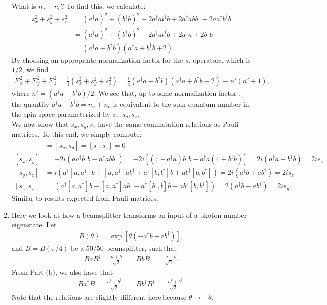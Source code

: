 \documentclass{article}
\theoremstyle{definition}
\newcommand{\f}[2]{\frac{#1}{#2}}
\newcommand{\lp}{\left(}
\newcommand{\rp}{\right)}
\newcommand{\lb}{\left[}
\newcommand{\rb}{\right]}
\begin{document}
\begin{enumerate}[label=\alph*)]
\noindent What is $n_a + n_b$? To find this, we calculate:
\begin{align*}
s_x^2 + s_y^2 + s_z^2 
&= (a^\dagger a)^2 + (b^\dagger b)^2 - 2a^\dagger a b^\dagger b + 2a^\dagger a bb^\dagger + 2 aa^\dagger b^\dagger b  \\
&=  (a^\dagger a)^2 + (b^\dagger b)^2 + 2a^\dagger a b^\dagger b + 2a^\dagger a + 2b^\dagger b \\
&= (a^\dagger a + b^\dagger b) ( a^\dagger a + b^\dagger b + 2).
\end{align*}
By choosing an appropriate normalization factor for the $s_i$ operators, which is $1/2$, we find 
\begin{align*}
\Sigma_x^2 + \Sigma_y^2 + \Sigma_z^2 = \f{1}{4}(s_x^2 + s_y^2 + s_z^2) = \f{1}{4} (a^\dagger a + b^\dagger b) ( a^\dagger a + b^\dagger b + 2) \equiv n' (n'+1),
\end{align*}
where $n' = (a^\dagger a + b^\dagger b)/2$. We see that, up to some normalization factor , the quantity $a^\dagger a + b^\dagger b = n_a + n_b$ is equivalent to the spin quantum number in the spin space parameterized by $s_x, s_y, s_z$. \\


\noindent We now show that $s_x, s_y, s_z$ have the same commutation relations as Pauli matrices. To this end, we simply compute:
\begin{align*}
[s_x, s_x] &= [s_y, s_y] = [s_z, s_z] = 0\\
[s_x, s_y] &= -2i (aa^\dagger b^\dagger b - a^\dagger a bb^\dagger) = -2i [ (1 + a^\dagger a)b^\dagger b - a^\dagger a(1+b^\dagger b)  ] = 2 i( a^\dagger a - b^\dagger b ) = 2 i s_z  \\
[s_y, s_z] &= i ( a^\dagger [a,a^\dagger] b + [a,a^\dagger]ab^\dagger + a^\dagger [b,b^\dagger] b + ab^\dagger [b,b^\dagger]) =  2 i ( a^\dagger b + ab^\dagger) = 2 i s_x \\
[s_z, s_x] &=  (a^\dagger [a,a^\dagger] b - [a,a^\dagger] ab^\dagger - a^\dagger [b^\dagger,b] b - ab^\dagger[b,b^\dagger]) = 2 (a^\dagger b - ab^\dagger ) =  2 i s_y.
\end{align*}
Similar to results expected from Pauli matrices. 

\item Here we look at how a beamsplitter transforms an input of a photon-number eigenstate. Let 
\begin{align*}
B(\theta) = \exp\lb \theta \lp -a^\dagger b + ab^\dagger  \rp\rb,
\end{align*}
and $B = B(\pi/4)$ be a 50/50 beamsplitter, such that
\begin{align*}
BaB^\dagger = \f{a+b}{\sqrt{2}} \quad\quad  BbB^\dagger = \f{-a + b}{\sqrt{2}}.
\end{align*}
From Part (b), we also have that
\begin{align*}
Ba^\dagger B^\dagger = \f{a^\dagger + b^\dagger}{\sqrt{2}} \quad\quad Bb^\dagger B^\dagger = \f{-a^\dagger + b^\dagger}{\sqrt{2}}.
\end{align*}
Note that the relations are slightly different here because $\theta \to -\theta$.


\end{enumerate}
\end{document}

